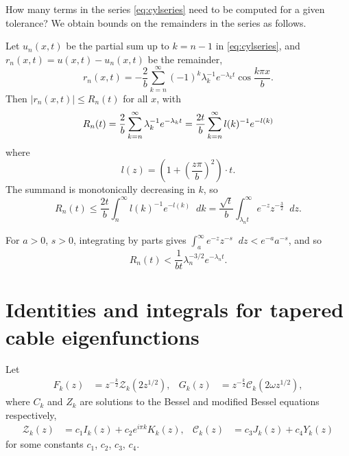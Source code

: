 \documentclass[parskip=half]{scrartcl}
\newcommand{\Int}[2]{\int_{#1}^{#2}\!}
\newcommand{\D}{\mathop{}\!d}
\newcommand{\cZ}{\mathcal{Z}}
\newcommand{\cC}{\mathcal{C}}
\theoremstyle{nonumberplain}
\begin{document}
How many terms in the series \eqref{eq:cylseries} need to be computed for a given tolerance?
We obtain bounds on the remainders in the series as follows.

Let $u_n(x,t)$ be the partial sum up to $k=n-1$ in \eqref{eq:cylseries}, and $r_n(x,t) = u(x,t) - u_n(x,t)$
be the remainder,
\begin{equation}
    r_n(x,t) = -\frac{2}{b}\sum_{k=n}^{\infty} (-1)^k\lambda_k^{-1}e^{-\lambda_k t}\cos\frac{k\pi x}{b}.
\end{equation}
Then $|r_n(x,t)|\leq R_n(t)$ for all $x$, with
\begin{equation}
    R_n(t) = \frac{2}{b}\sum_{k=n}^{\infty} \lambda_k^{-1}e^{-\lambda_k t}\\
    = \frac{2t}{b}\sum_{k=n}^{\infty} l(k)^{-1}e^{-l(k)}\\
\end{equation}
where
\[
    l(z) = \left(1+\left(\frac{z\pi}{b}\right)^2\right)\cdot t.
\]
The summand is monotonically decreasing in $k$, so
\begin{equation}
    \label{eq:rnigamma}
    R_n(t)
    \leq \frac{2t}{b}\Int{n}{\infty} l(k)^{-1}e^{-l(k)}\D k
    = \frac{\sqrt{t}}{b} \Int{\lambda_n t}{\infty} e^{-z}z^{-\frac{3}{2}} \D z.
\end{equation}

For $a>0$, $s>0$, integrating by parts gives
$\displaystyle \Int{a}{\infty} e^{-z}z^{-s}\D z < e^{-a}a^{-s}$,
and so
\begin{equation}
    R_n(t) < \frac{1}{b t}\lambda_n^{-3/2}e^{-\lambda_n t}.
\end{equation}

\section{Identities and integrals for tapered cable eigenfunctions}
\label{ap:conid}

\newcommand{\Fp}{\smash{F^{\mathrlap{\prime}}}\mkern-2.0mu}
\newcommand{\Gp}{\smash{G^{\mathrlap{\prime}}}\mkern-2.0mu}

Let
\begin{equation}
    \begin{aligned}
        F_k(z) &= z^{-\frac{k}{2}}\cZ_k(2z^{1/2}),&
        G_k(z) &= z^{-\frac{k}{2}}\cC_k(2\omega z^{1/2}),
    \end{aligned}
\end{equation}
where $C_k$ and $Z_k$ are solutions to the Bessel and modified Bessel equations
respectively,
\begin{equation}
    \begin{aligned}
        \cZ_k(z) &= c_1 I_k(z) + c_2 e^{i\pi k} K_k(z),&
        \cC_k(z) &= c_3 J_k(z) + c_4 Y_k(z)
    \end{aligned}
\end{equation}
for some constants $c_1$, $c_2$, $c_3$, $c_4$.
\end{document}
